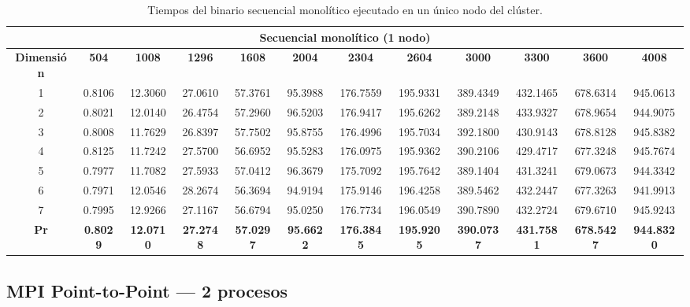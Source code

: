 \documentclass{article}
\begin{document}
\begin{table}[H]
\centering
\tiny
\begin{tabular}{|c|c|c|c|c|c|c|c|c|c|c|c|}
\hline
\multicolumn{12}{|c|}{\textbf{Secuencial monolítico (1 nodo)}} \\
\hline
\textbf{Dimensión} & \textbf{504} & \textbf{1008} & \textbf{1296} & \textbf{1608} & \textbf{2004} & \textbf{2304} & \textbf{2604} & \textbf{3000} & \textbf{3300} & \textbf{3600} & \textbf{4008} \\
\hline
1 & 0.8106 & 12.3060 & 27.0610 & 57.3761 & 95.3988 & 176.7559 & 195.9331 & 389.4349 & 432.1465 & 678.6314 & 945.0613 \\
2 & 0.8021 & 12.0140 & 26.4754 & 57.2960 & 96.5203 & 176.9417 & 195.6262 & 389.2148 & 433.9327 & 678.9654 & 944.9075 \\
3 & 0.8008 & 11.7629 & 26.8397 & 57.7502 & 95.8755 & 176.4996 & 195.7034 & 392.1800 & 430.9143 & 678.8128 & 945.8382 \\
4 & 0.8125 & 11.7242 & 27.5700 & 56.6952 & 95.5283 & 176.0975 & 195.9362 & 390.2106 & 429.4717 & 677.3248 & 945.7674 \\
5 & 0.7977 & 11.7082 & 27.5933 & 57.0412 & 96.3679 & 175.7092 & 195.7642 & 389.1404 & 431.3241 & 679.0673 & 944.3342 \\
6 & 0.7971 & 12.0546 & 28.2674 & 56.3694 & 94.9194 & 175.9146 & 196.4258 & 389.5462 & 432.2447 & 677.3263 & 941.9913 \\
7 & 0.7995 & 12.9266 & 27.1167 & 56.6794 & 95.0250 & 176.7734 & 196.0549 & 390.7890 & 432.2724 & 679.6710 & 945.9243 \\
\hline
\textbf{Pr} & \textbf{0.8029} & \textbf{12.0710} & \textbf{27.2748} & \textbf{57.0297} & \textbf{95.6622} & \textbf{176.3845} & \textbf{195.9205} & \textbf{390.0737} & \textbf{431.7581} & \textbf{678.5427} & \textbf{944.8320} \\
\hline
\end{tabular}
\caption{Tiempos del binario secuencial monolítico ejecutado en un único nodo del clúster.}
\label{tab:secuencial}
\end{table}

\subsection{MPI Point-to-Point --- 2 procesos}
\end{document}
